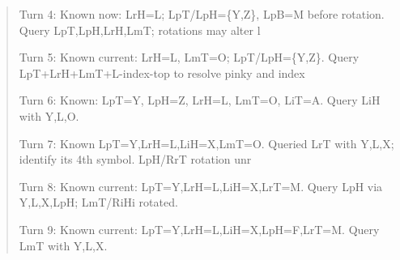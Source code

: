 \begin{quote}\small\ttfamily\raggedright
\textnormal{Turn 4:} Known now: LrH=L; LpT/LpH=\{Y,Z\}, LpB=M before rotation. Query LpT,LpH,LrH,LmT; rotations may alter l\par\medskip
\textnormal{Turn 5:} Known current: LrH=L, LmT=O; LpT/LpH=\{Y,Z\}. Query LpT+LrH+LmT+L-index-top to resolve pinky and index\par\medskip
\textnormal{Turn 6:} Known: LpT=Y, LpH=Z, LrH=L, LmT=O, LiT=A. Query LiH with Y,L,O.\par\medskip
\textnormal{Turn 7:} Known LpT=Y,LrH=L,LiH=X,LmT=O. Queried LrT with Y,L,X; identify its 4th symbol. LpH/RrT rotation unr\par\medskip
\textnormal{Turn 8:} Known current: LpT=Y,LrH=L,LiH=X,LrT=M. Query LpH via Y,L,X,LpH; LmT/RiHi rotated.\par\medskip
\textnormal{Turn 9:} Known current: LpT=Y,LrH=L,LiH=X,LpH=F,LrT=M. Query LmT with Y,L,X.\par\medskip
\end{quote}
